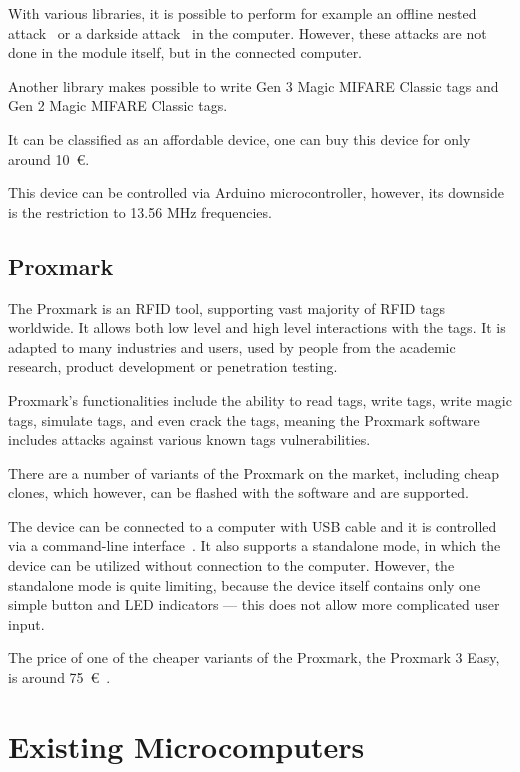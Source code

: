 With various libraries, it is possible to perform for example an offline nested attack~\cite{nestedpn532} or a darkside attack~\cite{darksidepn532} in the computer. However, these attacks are not done in the module itself, but in the connected computer.

Another library makes possible to write Gen 3 Magic MIFARE Classic tags and Gen 2 Magic MIFARE Classic tags.~\cite{clonerpn532}

It can be classified as an affordable device, one can buy this device for only around 10~€.~\cite{pn532shop}

This device can be controlled via Arduino microcontroller, however, its downside is the restriction to 13.56 MHz frequencies.


\subsection{Proxmark}

The Proxmark is an RFID tool, supporting vast majority of RFID tags worldwide. It allows both low level and high level interactions with the tags. It is adapted to many industries and users, used by people from the academic research, product development or penetration testing.~\cite{proxmark}

Proxmark's functionalities include the ability to read tags, write tags, write magic tags, simulate tags, and even crack the tags, meaning the Proxmark software includes attacks against various known tags vulnerabilities. \cite{proxmarkwiki}

There are a number of variants of the Proxmark on the market, including cheap clones, which however, can be flashed with the software and are supported.~\cite{proxmarkclones}

The device can be connected to a computer with USB cable and it is controlled via a command-line interface~\cite{proxmarkcommands}. It also supports a standalone mode, in which the device can be utilized without connection to the computer. However, the standalone mode is quite limiting, because the device itself contains only one simple button and LED indicators --- this does not allow more complicated user input.~\cite{proxmarkstandalone}

The price of one of the cheaper variants of the Proxmark, the Proxmark 3 Easy, is around 75~€~\cite{proxmarkshop}.


\section{Existing Microcomputers}


